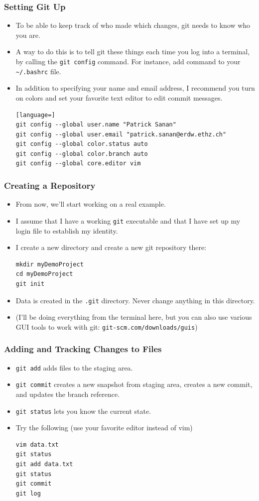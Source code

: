 \documentclass{beamer}
\begin{document}
\begin{frame}[fragile]
\frametitle{Setting Git Up}
\begin{itemize}
\item
To be able to keep track of who made which changes, git needs to know who you are.
\item 
A way to do this is to tell git these things each time you log into a terminal, by calling the \lstinline{git config} command. For instance, add command to your \lstinline{~/.bashrc} file.
\item 
In addition to specifying your name and email address, I recommend you turn on colors and set your favorite text editor to edit commit messages.
\begin{lstlisting}[language=]
git config --global user.name "Patrick Sanan"
git config --global user.email "patrick.sanan@erdw.ethz.ch"
git config --global color.status auto
git config --global color.branch auto 
git config --global core.editor vim
\end{lstlisting}
\end{itemize}
\end{frame}

\begin{frame}[fragile]
\frametitle{Creating a Repository}
\begin{itemize}
\item From now, we'll start working on a real example. 
\item I assume that I have a working \lstinline{git} executable and that I have set up my login file to establish my identity.
\item I create a new directory and create a new git repository there:
\begin{lstlisting}[language=C++]
mkdir myDemoProject
cd myDemoProject
git init
\end{lstlisting}
\item Data is created in the \lstinline{.git} directory. Never change anything in this directory.
\item (I'll be doing everything from the terminal here, but you can also use various GUI tools to work with git: \texttt{git-scm.com/downloads/guis})
\end{itemize}
\end{frame}

\begin{frame}[fragile]
\frametitle{Adding and Tracking Changes to Files}
\begin{itemize}
\item \lstinline{git add} adds files to the staging area.
\item \lstinline{git commit} creates a new snapshot from staging area, creates a new commit, and updates the branch reference.
\item \lstinline{git status} lets you know the current state.
\item Try the following (use your favorite editor instead of vim)
\begin{lstlisting}[language=C++]
vim data.txt
git status
git add data.txt
git status
git commit
git log
\end{lstlisting}
\end{itemize}
\end{frame}
\end{document}
